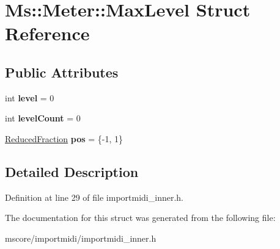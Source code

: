 \hypertarget{struct_ms_1_1_meter_1_1_max_level}{}\section{Ms\+:\+:Meter\+:\+:Max\+Level Struct Reference}
\label{struct_ms_1_1_meter_1_1_max_level}
\subsection*{Public Attributes}
\begin{DoxyCompactItemize}
\item 
\mbox{\label{struct_ms_1_1_meter_1_1_max_level_a56fe1b39635f4486e19ee35848f23a6d}} 
int {\bfseries level} = 0
\item 
\mbox{\label{struct_ms_1_1_meter_1_1_max_level_a4a2d9bbedbddbb01d08885fc27d21827}} 
int {\bfseries level\+Count} = 0
\item 
\mbox{\label{struct_ms_1_1_meter_1_1_max_level_a321a0d36225bd7b95fe2f2da2b9d06d5}} 
\hyperlink{class_ms_1_1_reduced_fraction}{Reduced\+Fraction} {\bfseries pos} = \{-\/1, 1\}
\end{DoxyCompactItemize}


\subsection{Detailed Description}


Definition at line 29 of file importmidi\+\_\+inner.\+h.



The documentation for this struct was generated from the following file\+:\begin{DoxyCompactItemize}
\item 
mscore/importmidi/importmidi\+\_\+inner.\+h\end{DoxyCompactItemize}
